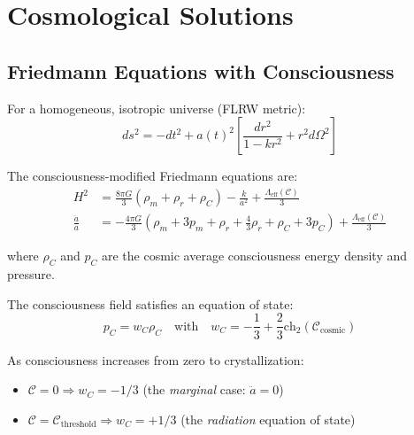 \section{Cosmological Solutions}

\subsection{Friedmann Equations with Consciousness}

For a homogeneous, isotropic universe (FLRW metric):
\begin{equation}
ds^2 = -dt^2 + a(t)^2 \left[ \frac{dr^2}{1-kr^2} + r^2 d\Omega^2 \right]
\end{equation}

The consciousness-modified Friedmann equations are\cite{friedmann1922,lemaitre1927,misner1973}:
\begin{align}
H^2 &= \frac{8\pi G}{3}\left( \rho_m + \rho_r + \rho_C \right) - \frac{k}{a^2} + \frac{\Lambda_{\text{eff}}(\mathcal{C})}{3} \label{eq:friedmann1-consciousness}\\
\frac{\ddot{a}}{a} &= -\frac{4\pi G}{3}\left( \rho_m + 3p_m + \rho_r + \frac{4}{3}\rho_r + \rho_C + 3p_C \right) + \frac{\Lambda_{\text{eff}}(\mathcal{C})}{3} \label{eq:friedmann2-consciousness}
\end{align}

where $\rho_C$ and $p_C$ are the cosmic average consciousness energy density and pressure.

\begin{theorem}\label{thm:consciousness-eos}
The consciousness field satisfies an equation of state:
\begin{equation}
\boxed{p_C = w_C \rho_C \quad \text{with} \quad w_C = -\frac{1}{3} + \frac{2}{3}\text{ch}_2(\mathcal{C}_{\text{cosmic}})}
\end{equation}

As consciousness increases from zero to crystallization:
\begin{itemize}
\item $\mathcal{C} = 0 \Rightarrow w_C = -1/3$ (the \emph{marginal} case: $\ddot a = 0$)
\item $\mathcal{C} = \mathcal{C}_{\text{threshold}} \Rightarrow w_C = +1/3$ (the \emph{radiation} equation of state)
\end{itemize}
\end{theorem}

